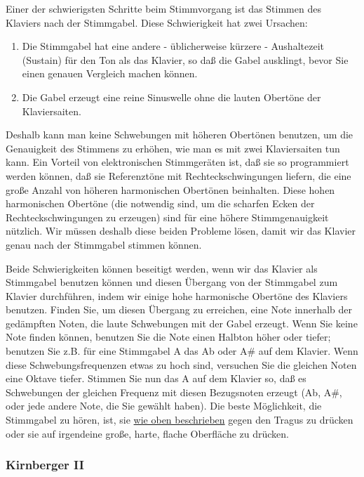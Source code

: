 Einer der schwierigsten Schritte beim Stimmvorgang ist das Stimmen des Klaviers nach der Stimmgabel.
Diese Schwierigkeit hat zwei Ursachen:

\begin{enumerate}[label={\arabic*.}] 
 \item Die Stimmgabel hat eine andere - üblicherweise kürzere - Aushaltezeit (Sustain) für den Ton als das
 Klavier, so daß die Gabel ausklingt, bevor Sie einen genauen Vergleich machen können.
 \item Die Gabel erzeugt eine reine Sinuswelle ohne die lauten Obertöne der Klaviersaiten.
\end{enumerate}

Deshalb kann man keine Schwebungen mit höheren Obertönen benutzen, um die Genauigkeit des Stimmens zu erhöhen, wie man es mit zwei Klaviersaiten tun kann.
Ein Vorteil von elektronischen Stimmgeräten ist, daß sie so programmiert werden können, daß sie Referenztöne mit Rechteckschwingungen liefern, die eine große Anzahl von höheren harmonischen Obertönen beinhalten.
Diese hohen harmonischen Obertöne (die notwendig sind, um die scharfen Ecken der Rechteckschwingungen zu erzeugen) sind für eine höhere Stimmgenauigkeit nützlich.
Wir müssen deshalb diese beiden Probleme lösen, damit wir das Klavier genau nach der Stimmgabel stimmen können.

Beide Schwierigkeiten können beseitigt werden, wenn wir das Klavier als Stimmgabel benutzen können und diesen Übergang von der Stimmgabel zum Klavier durchführen, indem wir einige hohe harmonische Obertöne des Klaviers benutzen.
Finden Sie, um diesen Übergang zu erreichen, eine Note innerhalb der gedämpften Noten, die laute Schwebungen mit der Gabel erzeugt.
Wenn Sie keine Note finden können, benutzen Sie die Note einen Halbton höher oder tiefer; benutzen Sie z.B. für eine Stimmgabel A das Ab oder A\# auf dem Klavier.
Wenn diese Schwebungsfrequenzen etwas zu hoch sind, versuchen Sie die gleichen Noten eine Oktave tiefer.
Stimmen Sie nun das A auf dem Klavier so, daß es Schwebungen der gleichen Frequenz mit diesen Bezugsnoten erzeugt (Ab, A\#, oder jede andere Note, die Sie gewählt haben).
Die beste Möglichkeit, die Stimmgabel zu hören, ist, sie \hyperref[c2_3_gabel]{wie oben beschrieben} gegen den Tragus zu drücken oder sie auf irgendeine große, harte, flache Oberfläche zu drücken.
 

\label{c2_6c}
\subsubsection{Kirnberger II}
\label{c2_6_kirn}

